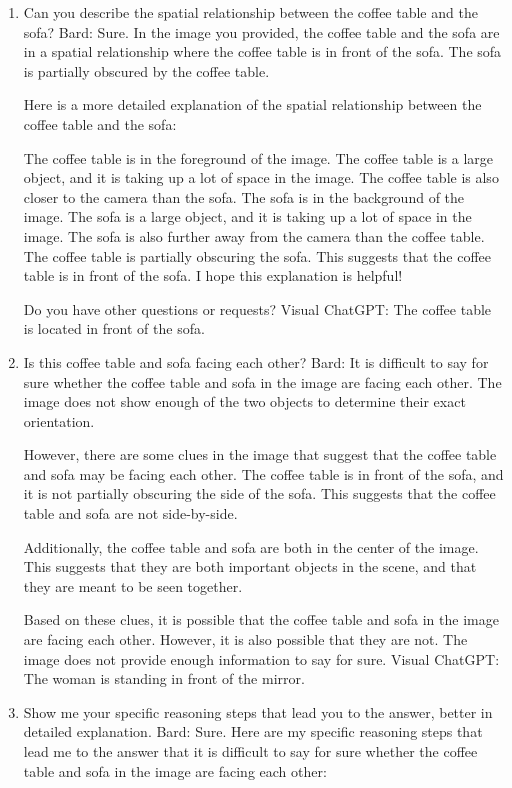 \begin{enumerate}
    \item Can you describe the spatial relationship between the coffee table and the sofa?
    \subitem Bard: 
    Sure. In the image you provided, the coffee table and the sofa are in a spatial relationship where the coffee table is in front of the sofa. The sofa is partially obscured by the coffee table.
    
    Here is a more detailed explanation of the spatial relationship between the coffee table and the sofa:
    
    The coffee table is in the foreground of the image. The coffee table is a large object, and it is taking up a lot of space in the image. The coffee table is also closer to the camera than the sofa.
    The sofa is in the background of the image. The sofa is a large object, and it is taking up a lot of space in the image. The sofa is also further away from the camera than the coffee table.
    The coffee table is partially obscuring the sofa. This suggests that the coffee table is in front of the sofa.
    I hope this explanation is helpful!
    
    Do you have other questions or requests?
    \subitem Visual ChatGPT: The coffee table is located in front of the sofa.
    \item Is this coffee table and sofa facing each other?
    \subitem Bard: 
    It is difficult to say for sure whether the coffee table and sofa in the image are facing each other. The image does not show enough of the two objects to determine their exact orientation.
    
    However, there are some clues in the image that suggest that the coffee table and sofa may be facing each other. The coffee table is in front of the sofa, and it is not partially obscuring the side of the sofa. This suggests that the coffee table and sofa are not side-by-side.
    
    Additionally, the coffee table and sofa are both in the center of the image. This suggests that they are both important objects in the scene, and that they are meant to be seen together.
    
    Based on these clues, it is possible that the coffee table and sofa in the image are facing each other. However, it is also possible that they are not. The image does not provide enough information to say for sure.
    \subitem Visual ChatGPT: The woman is standing in front of the mirror.
    \item Show me your specific reasoning steps that lead you to the answer, better in detailed explanation.
    \subitem Bard: 
    Sure. Here are my specific reasoning steps that lead me to the answer that it is difficult to say for sure whether the coffee table and sofa in the image are facing each other:
    

\end{enumerate}
